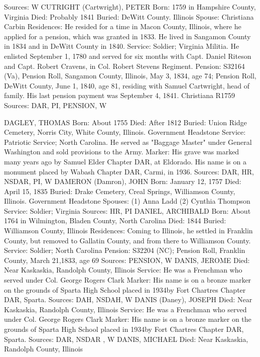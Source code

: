 Sources: W 
CUTRIGHT (Cartwright), PETER 
Born: 1759 in Hampshire County, Virginia 
Died: Probably 1841 
Buried: DeWitt County. Illinois 
Spouse: Christiana Carbin 
Residences: He resided for a time in Macon County, Illinois, where he applied for a pension, which was granted in 1833. He lived in Sangamon County in 1834 and in DeWitt County in 1840. 
Service: Soldier; Virginia Militia. He enlisted September 1, 1780 and served for six months with Capt. Daniel Riteson and Capt. Robert Cravens, in Col. Robert Stevens Regiment. 
Pension: S32164 (Va), Pension Roll, Sangamon County, Illinois, May 3, 1834, age 74; Pension Roll, DeWitt County, June 1, 1840, age 81, residing with Samuel Cartwright, head of family. His last pension payment was September 4, 1841. Christiana R1759 
Sources: DAR, PI, PENSION, W 


DAGLEY, THOMAS 
Born: About 1755 
Died: After 1812 
Buried: Union Ridge Cemetery, Norris City, White County, Illinois. Government Headstone 
Service: Patriotic Service;  North Carolina. He served as "Baggage Master" under General Washington and sold provisions to the Army. 
Marker: His grave was marked many years ago by Samuel Elder Chapter DAR, at Eldorado. His name is on a monument placed by Wabash Chapter DAR, Carmi, in 1936. 
Sources: DAR, HR, NSDAR, PI, W 
DAMERON (Damron), JOHN
Born:  January 12, 1757 
Died: April 15, 1835 
Buried: Drake Cemetery, Creal Springs, Williamson County, Illinois. Government Headstone 
Spouses: (1) Anna Ladd
	 (2) Cynthia Thompson 
Service: Soldier; Virginia 
Sources: HR, PI 
DANIEL, ARCHIBALD
Born: About 1764 in Wilmington, Bladen County, North Carolina 
Died: 1844 
Buried: Williamson County, Illinois 
Residences: Coming to Illinois, he settled in Franklin County, but removed to Gallatin County, and from there to Williamson County.
Service: Soldier; North Carolina
Pension: S32204 (NC); Pension Roll, Franklin County, March 21,1833, age 69 
Sources: PENSION, W 
DANIS, JEROME 
Died: Near Kaskaskia, Randolph County, Illinois 
Service: He was a Frenchman who served under Col. George Rogers Clark 
Marker: His name is on a bronze marker on the grounds of Sparta High School placed in 1934by Fort Chartres Chapter DAR, Sparta. 
Sources: DAH, NSDAH, W 
DANIS (Daney), JOSEPH 
Died: Near Kaskaskia, Randolph County, Illinois 
Service: He was a Frenchman who served under Col. George Rogers Clark 
Marker: His name is on a bronze marker on the grounds of Sparta High School placed in 1934by Fort Chartres Chapter DAR, Sparta. 
Sources: DAR, NSDAR , W 
DANIS, MICHAEL
Died: Near Kaskaskia, Randolph County, Illinois 
